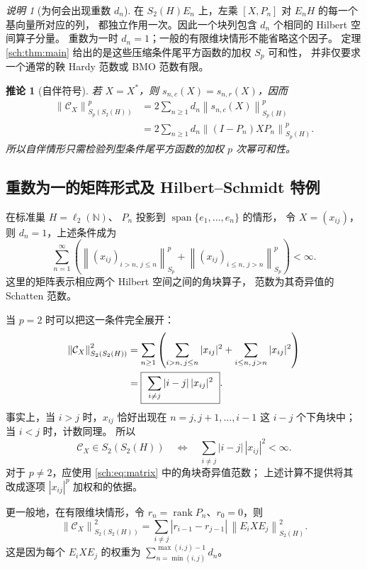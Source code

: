 \documentclass[UTF8,11pt,a4paper,fontset=fandol]{ctexart}
\newtheorem{corollary}[theorem]{推论}
\theoremstyle{remark}
\newtheorem{remark}[theorem]{说明}
\newcommand{\CC}{\mathcal C}
\newcommand{\norm}[1]{\left\lVert #1\right\rVert}
\DeclareMathOperator{\rank}{rank}
\numberwithin{equation}{section}
\begin{document}
\begin{remark}[为何会出现重数 $d_n$]
在 $S_2(H)E_n$ 上，左乘 $[X,P_n]$ 对 $E_nH$ 的每一个基向量所对应的列，
都独立作用一次。因此一个块列包含 $d_n$ 个相同的 Hilbert 空间算子分量。
重数为一时 $d_n=1$；一般的有限维块情形不能省略这个因子。
定理 \ref{sch:thm:main} 给出的是这些压缩条件尾平方函数的加权 $S_p$ 可和性，
并非仅要求一个通常的鞅 Hardy 范数或 BMO 范数有限。
\end{remark}

\begin{corollary}[自伴符号]
若 $X=X^*$，则 $s_{n,c}(X)=s_{n,r}(X)$，因而
\begin{align*}
 \norm{\CC_X}_{S_p(S_2(H))}^p
 &=2\sum_{n\geq1}d_n\norm{s_{n,c}(X)}_{S_p(H)}^p\\
 &=2\sum_{n\geq1}d_n\norm{(I-P_n)XP_n}_{S_p(H)}^p.
\end{align*}
所以自伴情形只需检验列型条件尾平方函数的加权 $p$ 次幂可和性。
\end{corollary}

\subsection{重数为一的矩阵形式及 Hilbert--Schmidt 特例}

在标准巢 $H=\ell_2(\mathbb N)$、
$P_n$ 投影到 $\operatorname{span}\{e_1,\ldots,e_n\}$ 的情形，
令 $X=(x_{ij})$，则 $d_n=1$，上述条件成为
\begin{equation}\label{sch:eq:matrix}
 \sum_{n=1}^{\infty}\left(
  \norm{(x_{ij})_{i>n,\,j\leq n}}_{S_p}^p
  +\norm{(x_{ij})_{i\leq n,\,j>n}}_{S_p}^p
 \right)<\infty.
\end{equation}
这里的矩阵表示相应两个 Hilbert 空间之间的角块算子，
范数为其奇异值的 Schatten 范数。

当 $p=2$ 时可以把这一条件完全展开：
\begin{align}
 \norm{\CC_X}_{S_2(S_2(H))}^2
 &=\sum_{n\geq1}\left(
   \sum_{i>n,\,j\leq n}|x_{ij}|^2
   +\sum_{i\leq n,\,j>n}|x_{ij}|^2\right)\notag\\
 &=\boxed{\ \sum_{i\ne j}|i-j|\,|x_{ij}|^2\ }.\label{sch:eq:hs}
\end{align}
事实上，当 $i>j$ 时，$x_{ij}$ 恰好出现在 $n=j,j+1,\ldots,i-1$
这 $i-j$ 个下角块中；当 $i<j$ 时，计数同理。
所以
\[
 \CC_X\in S_2(S_2(H))
 \quad\Longleftrightarrow\quad
 \sum_{i\ne j}|i-j|\,|x_{ij}|^2<\infty.
\]
对于 $p\ne2$，应使用 \eqref{sch:eq:matrix} 中的角块奇异值范数；
上述计算不提供将其改成逐项 $|x_{ij}|^p$ 加权和的依据。

更一般地，在有限维块情形，令 $r_n=\rank P_n$、$r_0=0$，则
\begin{equation}\label{sch:eq:blockhs}
 \norm{\CC_X}_{S_2(S_2(H))}^2
 =\sum_{i\ne j}|r_{i-1}-r_{j-1}|\,
   \norm{E_iXE_j}_{S_2(H)}^2.
\end{equation}
这是因为每个 $E_iXE_j$ 的权重为
$\sum_{n=\min(i,j)}^{\max(i,j)-1}d_n$。
\end{document}
